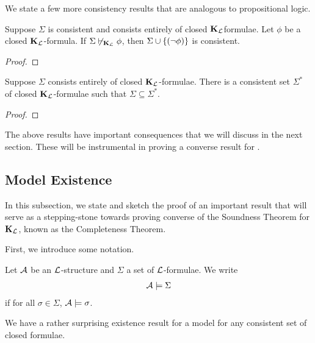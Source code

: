 We state a few more consistency results that are analogous to propositional logic.

\begin{boxproposition}
    Suppose $\Sigma$ is consistent and consists entirely of closed $\mathbf{K}_{\mathcal{L}}$formulae. Let $\phi$ be a closed $\mathbf{K}_{\mathcal{L}}$-formula. If $\Sigma \not\vdash_{\mathbf{K}_{\mathcal{L}}} \phi$, then $\Sigma \cup \left\{ \left( \neg \phi \right) \right\}$ is consistent.
\end{boxproposition}
\begin{proof}
    \sorry %
\end{proof}

\begin{boxproposition}\label{Ch2:Prop:Lindenbaum_FO}
    Suppose $\Sigma$ consists entirely of closed $\mathbf{K}_{\mathcal{L}}$-formulae. There is a consistent set $\Sigma^*$ of closed $\mathbf{K}_{\mathcal{L}}$-formulae such that $\Sigma \subseteq \Sigma^*$.
\end{boxproposition}
\begin{proof}
    \sorry %
\end{proof}

The above results have important consequences that we will discuss in the next section. These will be instrumental in proving a converse result for .


\subsection{Model Existence}

In this subsection, we state and sketch the proof of an important result that will serve as a stepping-stone towards proving converse of the Soundness Theorem for $\mathbf{K}_{\mathcal{L}}$, known as the Completeness Theorem.

First, we introduce some notation.

\begin{boxconvention}
    Let $\mathcal{A}$ be an $\mathcal{L}$-structure and $\Sigma$ a set of $\mathcal{L}$-formulae. We write
    \begin{align*}
        \mathcal{A} \models \Sigma
    \end{align*}
    if for all $\sigma \in \Sigma$, $\mathcal{A} \models \sigma$.
\end{boxconvention}

We have a rather surprising existence result for a model for any consistent set of closed formulae.

